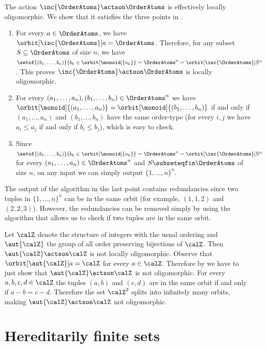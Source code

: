 \begin{example}
The action $\inc{\OrderAtoms}\actson\OrderAtoms$ is effectively locally oligomorphic.
We show that it satisfies the three points in .
%
\begin{enumerate}
\item For every $a\in\OrderAtoms$,
we have $\orbit[\inc{\OrderAtoms}]{a} = \OrderAtoms$.
Therefore, for any subset $S\subseteq\OrderAtoms$ of size $n$,
we have $\setof{(b_1,\dots,b_n)}{b_k\in\orbit[\monoid]{a_k}} = \OrderAtoms^n = \orbit[\inc{\OrderAtoms}]{S^n}$.
This proves $\inc{\OrderAtoms}\actson\OrderAtoms$ is locally oligomorphic.
\item For every $(a_1,\dots,a_n),(b_1,\dots,b_n)\in\OrderAtoms^n$ we have
$\orbit[\monoid]{(a_1,\dots,a_n)} = \orbit[\monoid]{(b_1,\dots,b_n)}$ if and only if $(a_1,\dots,a_n)$ and $(b_1,\dots,b_n)$ have the same order-type (for every $i,j$ we have $a_i \leq a_j$ if and only if $b_i \leq b_j$),
which is easy to check.
\item Since $\setof{(b_1,\dots,b_n)}{b_k\in\orbit[\monoid]{a_k}} = \OrderAtoms^n = \orbit[\inc{\OrderAtoms}]{S^n}$ for every $(a_1,\dots,a_n)\in\OrderAtoms^n$ and $S\subseteqfin\OrderAtoms$ of size $n$,
on any input we can simply output $\{1,\dots,n\}^n$.
\end{enumerate}
The output of the algorithm in the last point contains redundancies since two tuples in $\{1,\dots,n\}^n$ can be in the same orbit (for example, $(1,1,2)$ and $(2,2,3)$).
However, the redundancies can be removed simply by using the algorithm that allows us to check if two tuples are in the same orbit.
\end{example}
%
\begin{example}
Let $\calZ$ denote the structure of integers with the usual ordering and $\aut{\calZ}$ the group of all order preserving bijections of $\calZ$.
Then $\aut{\calZ}\actson\calZ$ is not locally oligomorphic.
Observe that $\orbit[\aut{\calZ}]{a} = \calZ$ for every $a\in\calZ$.
Therefore by  we have to just show that $\aut{\calZ}\actson\calZ$ is not oligomorphic.
For every $a,b,c,d\in\calZ$ the tuples $(a,b)$ and $(c,d)$ are in the same orbit if and only if $a - b = c - d$.
Therefore the set $\calZ^2$ splits into infinitely many orbits,
making $\aut{\calZ}\actson\calZ$ not oligomorphic.
\end{example}
%
\section{Hereditarily finite sets}
%